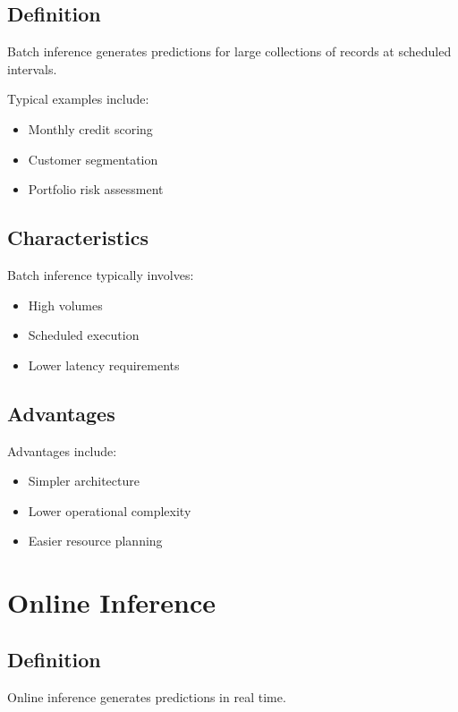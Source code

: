 \subsection{Definition}

Batch inference generates predictions for large collections of records at scheduled intervals.

Typical examples include:

\begin{itemize}
    \item Monthly credit scoring
    \item Customer segmentation
    \item Portfolio risk assessment
\end{itemize}

\subsection{Characteristics}

Batch inference typically involves:

\begin{itemize}
    \item High volumes
    \item Scheduled execution
    \item Lower latency requirements
\end{itemize}

\subsection{Advantages}

Advantages include:

\begin{itemize}
    \item Simpler architecture
    \item Lower operational complexity
    \item Easier resource planning
\end{itemize}

\section{Online Inference}

\subsection{Definition}

Online inference generates predictions in real time.

